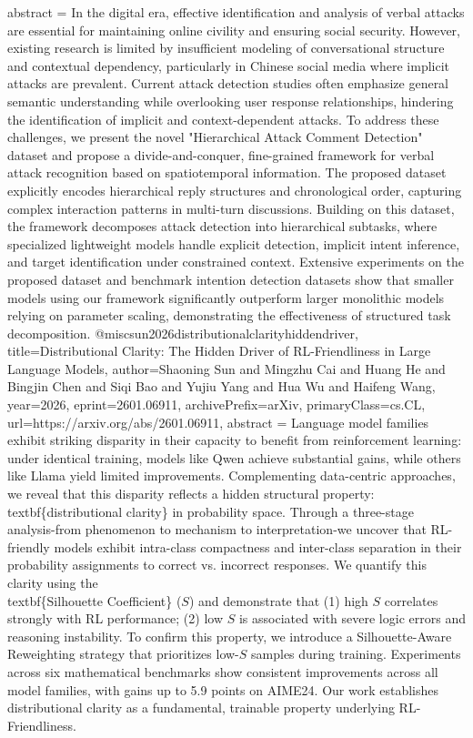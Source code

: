 {      abstract = {In the digital era, effective identification and analysis of verbal attacks are essential for maintaining online civility and ensuring social security. However, existing research is limited by insufficient modeling of conversational structure and contextual dependency, particularly in Chinese social media where implicit attacks are prevalent. Current attack detection studies often emphasize general semantic understanding while overlooking user response relationships, hindering the identification of implicit and context-dependent attacks. To address these challenges, we present the novel "Hierarchical Attack Comment Detection" dataset and propose a divide-and-conquer, fine-grained framework for verbal attack recognition based on spatiotemporal information. The proposed dataset explicitly encodes hierarchical reply structures and chronological order, capturing complex interaction patterns in multi-turn discussions. Building on this dataset, the framework decomposes attack detection into hierarchical subtasks, where specialized lightweight models handle explicit detection, implicit intent inference, and target identification under constrained context. Extensive experiments on the proposed dataset and benchmark intention detection datasets show that smaller models using our framework significantly outperform larger monolithic models relying on parameter scaling, demonstrating the effectiveness of structured task decomposition.}
}@misc{sun2026distributionalclarityhiddendriver,
      title={Distributional Clarity: The Hidden Driver of RL-Friendliness in Large Language Models}, 
      author={Shaoning Sun and Mingzhu Cai and Huang He and Bingjin Chen and Siqi Bao and Yujiu Yang and Hua Wu and Haifeng Wang},
      year={2026},
      eprint={2601.06911},
      archivePrefix={arXiv},
      primaryClass={cs.CL},
      url={https://arxiv.org/abs/2601.06911},
      abstract = {Language model families exhibit striking disparity in their capacity to benefit from reinforcement learning: under identical training, models like Qwen achieve substantial gains, while others like Llama yield limited improvements. Complementing data-centric approaches, we reveal that this disparity reflects a hidden structural property: \\textbf\{distributional clarity\} in probability space. Through a three-stage analysis-from phenomenon to mechanism to interpretation-we uncover that RL-friendly models exhibit intra-class compactness and inter-class separation in their probability assignments to correct vs. incorrect responses. We quantify this clarity using the \\textbf\{Silhouette Coefficient\} ($S$) and demonstrate that (1) high $S$ correlates strongly with RL performance; (2) low $S$ is associated with severe logic errors and reasoning instability. To confirm this property, we introduce a Silhouette-Aware Reweighting strategy that prioritizes low-$S$ samples during training. Experiments across six mathematical benchmarks show consistent improvements across all model families, with gains up to 5.9 points on AIME24. Our work establishes distributional clarity as a fundamental, trainable property underlying RL-Friendliness.}
}
